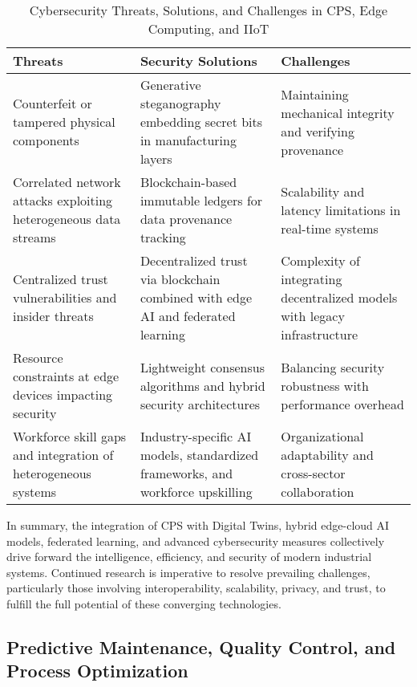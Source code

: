 \documentclass[sigconf]{acmart}
\begin{document}
\begin{table*}[htbp]
\centering
\caption{Cybersecurity Threats, Solutions, and Challenges in CPS, Edge Computing, and IIoT}
\label{tab:cybersecurity_summary}
\begin{adjustbox}{max width=\textwidth}
\begin{tabular}{@{}lll@{}}
\toprule
\textbf{Threats} & \textbf{Security Solutions} & \textbf{Challenges} \\ \midrule
Counterfeit or tampered physical components & Generative steganography embedding secret bits in manufacturing layers~\cite{ref9,ref13} & Maintaining mechanical integrity and verifying provenance \\
Correlated network attacks exploiting heterogeneous data streams & Blockchain-based immutable ledgers for data provenance tracking~\cite{ref20} & Scalability and latency limitations in real-time systems \\
Centralized trust vulnerabilities and insider threats & Decentralized trust via blockchain combined with edge AI and federated learning~\cite{ref22} & Complexity of integrating decentralized models with legacy infrastructure \\
Resource constraints at edge devices impacting security & Lightweight consensus algorithms and hybrid security architectures~\cite{ref31} & Balancing security robustness with performance overhead \\
Workforce skill gaps and integration of heterogeneous systems & Industry-specific AI models, standardized frameworks, and workforce upskilling~\cite{ref32} & Organizational adaptability and cross-sector collaboration \\ \bottomrule
\end{tabular}
\end{adjustbox}
\end{table*}

\bigskip

\noindent In summary, the integration of CPS with Digital Twins, hybrid edge-cloud AI models, federated learning, and advanced cybersecurity measures collectively drive forward the intelligence, efficiency, and security of modern industrial systems. Continued research is imperative to resolve prevailing challenges, particularly those involving interoperability, scalability, privacy, and trust, to fulfill the full potential of these converging technologies.

\subsection{Predictive Maintenance, Quality Control, and Process Optimization}
\end{document}
